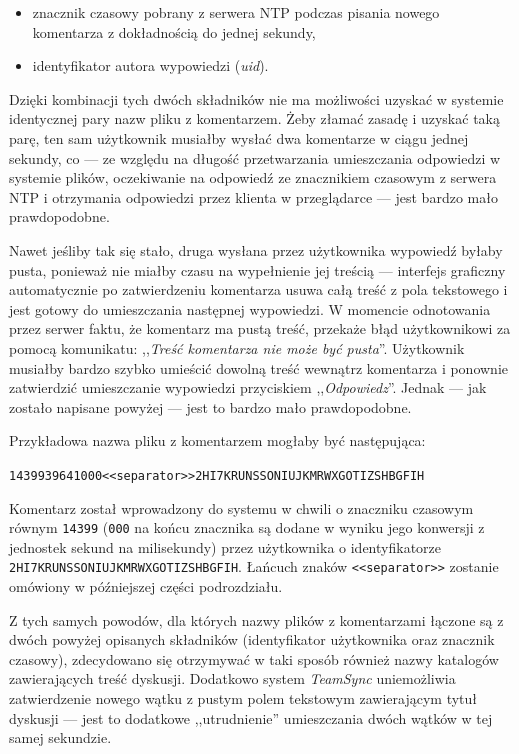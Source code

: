 \begin{itemize}[noitemsep]
  \item znacznik czasowy pobrany z serwera NTP podczas pisania nowego komentarza z dokładnością do jednej sekundy,
  
  \item identyfikator autora wypowiedzi (\emph{uid}).
\end{itemize}

Dzięki kombinacji tych dwóch składników nie ma możliwości uzyskać w systemie identycznej pary nazw pliku z komentarzem. Żeby złamać zasadę i uzyskać taką parę, ten sam użytkownik musiałby wysłać dwa komentarze w ciągu jednej sekundy, co --- ze względu na długość przetwarzania umieszczania odpowiedzi w systemie plików, oczekiwanie na odpowiedź ze znacznikiem czasowym z serwera NTP i otrzymania odpowiedzi przez klienta w przeglądarce --- jest bardzo mało prawdopodobne.

Nawet jeśliby tak się stało, druga wysłana przez użytkownika wypowiedź byłaby pusta, ponieważ nie miałby czasu na wypełnienie jej treścią --- interfejs graficzny automatycznie po zatwierdzeniu komentarza usuwa całą treść z pola tekstowego i jest gotowy do umieszczania następnej wypowiedzi. W momencie odnotowania przez serwer faktu, że komentarz ma pustą treść, przekaże błąd użytkownikowi za pomocą komunikatu: ,,\emph{Treść komentarza nie może być pusta}''. Użytkownik musiałby bardzo szybko umieścić dowolną treść wewnątrz komentarza i ponownie zatwierdzić umieszczanie wypowiedzi przyciskiem ,,\emph{Odpowiedz}''. Jednak --- jak zostało napisane powyżej --- jest to bardzo mało prawdopodobne.

Przykładowa nazwa pliku z komentarzem mogłaby być następująca:

\begin{center}
  \texttt{1439939641000<<separator>>2HI7KRUNSSONIUJKMRWXGOTIZSHBGFIH}
\end{center}

Komentarz został wprowadzony do systemu w chwili o znaczniku czasowym równym \texttt{14399} (\texttt{000} na końcu znacznika są dodane w wyniku jego konwersji z jednostek sekund na milisekundy) przez użytkownika o identyfikatorze \texttt{2HI7KRUN\-SSONIUJK\-MRWXGOTI\-ZSHBGFIH}. Łańcuch znaków \texttt{<<separator>>} zostanie omówiony w późniejszej części podrozdziału.

Z tych samych powodów, dla których nazwy plików z komentarzami łączone są z dwóch powyżej opisanych składników (identyfikator użytkownika oraz znacznik czasowy), zdecydowano się otrzymywać w taki sposób również nazwy katalogów zawierających treść dyskusji. Dodatkowo system \emph{TeamSync} uniemożliwia zatwierdzenie nowego wątku z pustym polem tekstowym zawierającym tytuł dyskusji --- jest to dodatkowe ,,utrudnienie'' umieszczania dwóch wątków w tej samej sekundzie.


